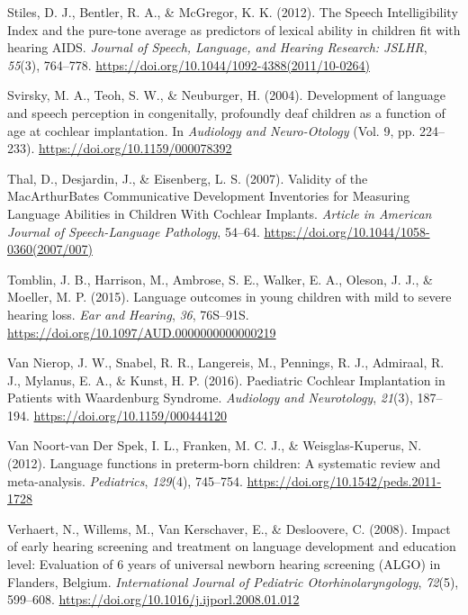 \documentclass[english,man]{apa6}
\begin{document}
\leavevmode\hypertarget{ref-stiles2012}{}%
Stiles, D. J., Bentler, R. A., \& McGregor, K. K. (2012). The Speech Intelligibility Index and the pure-tone average as predictors of lexical ability in children fit with hearing AIDS. \emph{Journal of Speech, Language, and Hearing Research: JSLHR}, \emph{55}(3), 764--778. \url{https://doi.org/10.1044/1092-4388(2011/10-0264)}

\leavevmode\hypertarget{ref-svirsky2004}{}%
Svirsky, M. A., Teoh, S. W., \& Neuburger, H. (2004). Development of language and speech perception in congenitally, profoundly deaf children as a function of age at cochlear implantation. In \emph{Audiology and Neuro-Otology} (Vol. 9, pp. 224--233). \url{https://doi.org/10.1159/000078392}

\leavevmode\hypertarget{ref-thal2007}{}%
Thal, D., Desjardin, J., \& Eisenberg, L. S. (2007). Validity of the MacArthurBates Communicative Development Inventories for Measuring Language Abilities in Children With Cochlear Implants. \emph{Article in American Journal of Speech-Language Pathology}, 54--64. \url{https://doi.org/10.1044/1058-0360(2007/007)}

\leavevmode\hypertarget{ref-tomblin2015}{}%
Tomblin, J. B., Harrison, M., Ambrose, S. E., Walker, E. A., Oleson, J. J., \& Moeller, M. P. (2015). Language outcomes in young children with mild to severe hearing loss. \emph{Ear and Hearing}, \emph{36}, 76S--91S. \url{https://doi.org/10.1097/AUD.0000000000000219}

\leavevmode\hypertarget{ref-vannierop2016}{}%
Van Nierop, J. W., Snabel, R. R., Langereis, M., Pennings, R. J., Admiraal, R. J., Mylanus, E. A., \& Kunst, H. P. (2016). Paediatric Cochlear Implantation in Patients with Waardenburg Syndrome. \emph{Audiology and Neurotology}, \emph{21}(3), 187--194. \url{https://doi.org/10.1159/000444120}

\leavevmode\hypertarget{ref-vannoort-vanderspek2012}{}%
Van Noort-van Der Spek, I. L., Franken, M. C. J., \& Weisglas-Kuperus, N. (2012). Language functions in preterm-born children: A systematic review and meta-analysis. \emph{Pediatrics}, \emph{129}(4), 745--754. \url{https://doi.org/10.1542/peds.2011-1728}

\leavevmode\hypertarget{ref-verhaert2008}{}%
Verhaert, N., Willems, M., Van Kerschaver, E., \& Desloovere, C. (2008). Impact of early hearing screening and treatment on language development and education level: Evaluation of 6 years of universal newborn hearing screening (ALGO) in Flanders, Belgium. \emph{International Journal of Pediatric Otorhinolaryngology}, \emph{72}(5), 599--608. \url{https://doi.org/10.1016/j.ijporl.2008.01.012}
\end{document}
